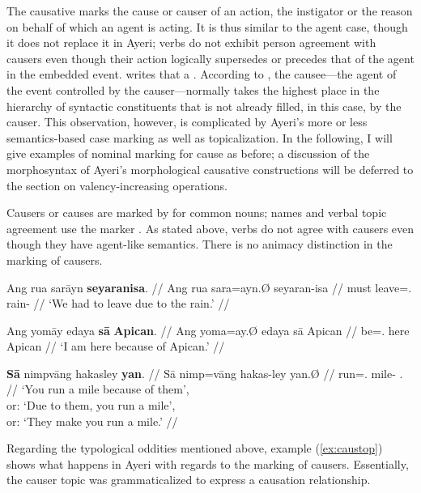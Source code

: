 The causative marks the cause or causer of an action, the instigator or the 
reason on behalf of which an agent is acting. It is thus similar to the agent 
case, though it does not replace it in Ayeri; verbs do not exhibit person 
agreement with causers even though their action logically supersedes or 
precedes that of the agent in the embedded event. \citet{dixon2000} writes that 
a . 
According to \citet[176]{comrie1989}, the causee---the agent of the event 
controlled by the causer---normally takes the highest place in the hierarchy of 
syntactic constituents that is not already filled, in this case, by the causer. 
This observation, however, is complicated by Ayeri's more or less 
semantics-based case marking as well as topicalization. In the following, I 
will give examples of nominal marking for cause as before; a discussion of the 
morphosyntax of Ayeri's morphological causative constructions will be deferred 
to the section on valency-increasing operations.

Causers or causes are marked by  for common nouns; names and 
verbal topic agreement use the marker . As stated above, verbs do 
not agree with causers even though they have agent-like semantics. There is no 
animacy distinction in the marking of causers.

\pex
\a\begingl
	\gla Ang rua sarāyn \textbf{seyaranisa}. //
	\glb Ang rua sara=ayn.Ø seyaran-isa //
	\glc \AgtT{} must leave=\Fpl{}.\Top{} rain-\Caus{} //
	\glft `We had to leave due to the rain.' //
\endgl

\a\begingl
	\gla Ang yomāy edaya \textbf{sā} \textbf{Apican}. //
	\glb Ang yoma=ay.Ø edaya sā Apican //
	\glc \AgtT{} be=\Fsg{}.\Top{} here \Caus{} Apican //
	\glft `I am here because of Apican.' //
\endgl

\a\label{ex:caustop}\begingl
	\gla \textbf{Sā} nimpvāng hakasley \textbf{yan}. //
	\glb Sā nimp=vāng hakas-ley yan.Ø //
	\glc \CauT{} run=\Ssg{}.\Aarg{} mile-\PargI{} \TplM{}.\Top{} //
	\glft `You run a mile because of them',\\
		or: `Due to them, you run a mile',\\
		or: `They make you run a mile.' //
\endgl

\xe

Regarding the typological oddities mentioned above, example (\ref{ex:caustop}) 
shows what happens in Ayeri with regards to the marking of causers. 
Essentially, the causer topic was grammaticalized to express a causation 
relationship.

